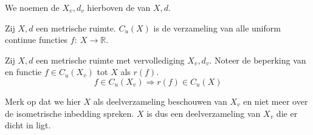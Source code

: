 \documentclass[main.tex]{subfiles}
\begin{document}
\begin{de}
  We noemen de $X_{v},d_{v}$ hierboven de  van $X,d$.
\end{de}

\begin{de}
  Zij $X,d$ een metrische ruimte.
  $C_{u}(X)$ is de verzameling van alle uniform continue functies $f:\ X \rightarrow \mathbb{R}$.
\end{de}

\begin{st}
  Zij $X,d$ een metrische ruimte met vervollediging $X_{v},d_{v}$.
  Noteer de beperking van en functie $f\in C_{u}(X_{v})$ tot $X$ als $r(f)$.
  \[ f \in C_{u}(X_{v}) \Rightarrow r(f) \in C_{u}(X) \]

\end{st}

\begin{opm}
    Merk op dat we hier $X$ als deelverzameling beschouwen van $X_{v}$ en niet meer over de isometrische inbedding spreken.
    $X$ is dus een deelverzameling van $X_{v}$ die er dicht in ligt.
\end{opm}
\end{document}
